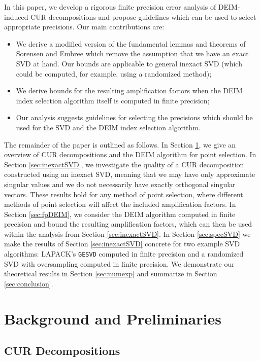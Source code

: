 \documentclass[12pt, a4paper]{article}
\theoremstyle{remark}
\begin{document}
In this paper, we develop a rigorous finite precision error analysis of DEIM-induced CUR decompositions and propose guidelines which can be used to select appropriate precisions. Our main contributions are:
\begin{itemize}
    \item We derive a modified version of the fundamental lemmas and theorems of Sorensen and Embree \cite{sorensen2016deim} which remove the assumption that we have an exact SVD at hand. Our bounds are applicable to general inexact SVD (which could be computed, for example, using a randomized method);
    \item We derive bounds for the resulting amplification factors when the DEIM index selection algorithm itself is computed in finite precision;
    \item Our analysis suggests guidelines for selecting the precisions which should be used for the SVD and the DEIM index selection algorithm. 
\end{itemize}
% 

The remainder of the paper is outlined as follows. In Section \ref{sec:background}, we give an overview of CUR decompositions and the DEIM algorithm for point selection. In Section \ref{sec:inexactSVD}, we investigate the quality of a CUR decomposition constructed using an inexact SVD, meaning that we may have only approximate singular values and we do not necessarily have exactly orthogonal singular vectors. These results hold for any method of point selection, where different methods of point selection will affect the included amplification factors. In Section \ref{sec:fpDEIM}, we consider the DEIM algorithm computed in finite precision and bound the resulting amplification factors, which can then be used within the analysis from Section \ref{sec:inexactSVD}. In Section \ref{sec:specSVD} we make the results of Section \ref{sec:inexactSVD} concrete for two example SVD algorithms: LAPACK's \texttt{GESVD} computed in finite precision and a randomized SVD with oversampling computed in finite precision. We demonstrate our theoretical results in Section \ref{sec:numexp} and summarize in Section \ref{sec:conclusion}.
\section{Background and Preliminaries}
\label{sec:background}

\subsection{CUR Decompositions}
\end{document}
